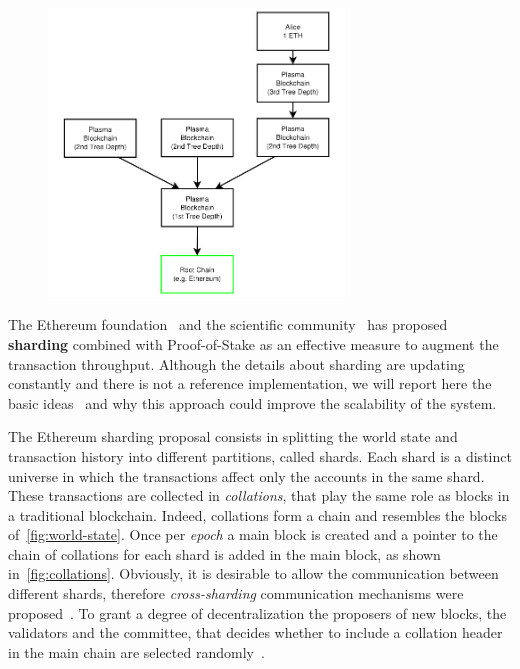 \begin{figure}[!h]
  \begin{center}
    \includegraphics[width=0.7\textwidth]{./res/img/plasma}
    \label{fig:plasma}
  \end{center}
\end{figure}

The Ethereum foundation~\cite{bib:mauve} and the scientific
community~\cite{bib:scaling-croman} has proposed \textbf{sharding} combined with
Proof-of-Stake as an effective measure to augment the transaction throughput.
Although the details about sharding are updating constantly and there is not a
reference implementation, we will report here the basic
ideas~\cite{bib:mauve,bib:sharding-faq} and why this approach could improve the
scalability of the system.

The Ethereum sharding proposal consists in splitting the world state and
transaction history into different partitions, called shards.
Each shard is a distinct universe in which the transactions affect only the
accounts in the same shard. These transactions are collected in
\emph{collations}, that play the same role as blocks in a traditional
blockchain. Indeed, collations form a chain and resembles the blocks
of~\autoref{fig:world-state}. Once per \emph{epoch} a main block is created
and a pointer to the chain of collations for each shard is added in the main
block, as shown in~\autoref{fig:collations}.
Obviously, it is desirable to allow the communication between different shards,
therefore \emph{cross-sharding} communication mechanisms were
proposed~\cite{bib:sharding-faq}. To grant a degree of decentralization the
proposers of new blocks, the validators and the committee, that decides whether
to include a collation header in the main chain are selected randomly~\cite{}.

